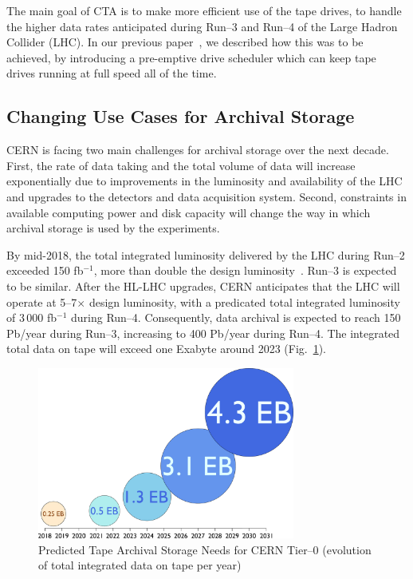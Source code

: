 \documentclass{webofc}
\begin{document}
The main goal of CTA is to make more efficient use of the tape drives, to handle the higher data rates
anticipated during Run--3 and Run--4 of the Large Hadron Collider (LHC). In our previous paper~\cite{cta_chep2016},
we described how this was to be achieved, by introducing a pre-emptive drive scheduler which can keep tape drives
running at full speed all of the time.

\subsection{Changing Use Cases for Archival Storage}

CERN is facing two main challenges for archival storage over the next decade. First, the rate of data taking
and the total volume of data will increase exponentially due to improvements in the luminosity and availability of the
LHC and upgrades to the detectors and data acquisition system. Second, constraints in available computing
power and disk capacity will change the way in which archival storage is used by the experiments.

By mid-2018, the total integrated luminosity delivered by the LHC during Run--2 exceeded 150 fb$^{-1}$, more
than double the design luminosity~\cite{atlas_status_lishep2018}. Run--3 is expected to be similar.
After the HL-LHC upgrades, CERN anticipates that the LHC will
operate at 5--7$\times$ design luminosity, with a predicated total integrated luminosity of 3\,000 fb$^{-1}$ during Run--4.
Consequently, data archival is expected to reach 150 Pb/year during Run--3,
increasing to 400 Pb/year during Run--4. The integrated total data on tape will exceed one Exabyte around
2023 (Fig.~\ref{fig:T0_predicted_storage}).

\begin{figure}[t]
   \vspace{-1cm}
   \includegraphics[width=20pc]{images/Storage}\hspace{0.5cm}\vspace{0.25cm}%
   \begin{minipage}[b]{9pc}
      \caption{Predicted Tape Archival Storage Needs for CERN Tier--0 (evolution of total integrated data on tape per year)}
      \label{fig:T0_predicted_storage}
   \end{minipage}
\end{figure}
\end{document}

